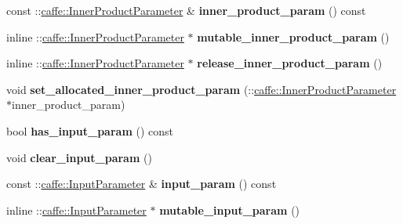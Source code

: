 \begin{DoxyCompactItemize}
\mbox{\label{classcaffe_1_1_layer_parameter_a1a350b27429e55733e114633ef5742a2}} 
const \+::\mbox{\hyperlink{classcaffe_1_1_inner_product_parameter}{caffe\+::\+Inner\+Product\+Parameter}} \& {\bfseries inner\+\_\+product\+\_\+param} () const
\item 
\mbox{\label{classcaffe_1_1_layer_parameter_a5242d3692dfb961f06d31edbbf6ab4df}} 
inline \+::\mbox{\hyperlink{classcaffe_1_1_inner_product_parameter}{caffe\+::\+Inner\+Product\+Parameter}} $\ast$ {\bfseries mutable\+\_\+inner\+\_\+product\+\_\+param} ()
\item 
\mbox{\label{classcaffe_1_1_layer_parameter_ae41ef48a356d6184a923774ea9990933}} 
inline \+::\mbox{\hyperlink{classcaffe_1_1_inner_product_parameter}{caffe\+::\+Inner\+Product\+Parameter}} $\ast$ {\bfseries release\+\_\+inner\+\_\+product\+\_\+param} ()
\item 
\mbox{\label{classcaffe_1_1_layer_parameter_a8054c3deaca85b1a269be1e074df4918}} 
void {\bfseries set\+\_\+allocated\+\_\+inner\+\_\+product\+\_\+param} (\+::\mbox{\hyperlink{classcaffe_1_1_inner_product_parameter}{caffe\+::\+Inner\+Product\+Parameter}} $\ast$inner\+\_\+product\+\_\+param)
\item 
\mbox{\label{classcaffe_1_1_layer_parameter_a3e9d7f5654f6e45a4c6228b922d06f8c}} 
bool {\bfseries has\+\_\+input\+\_\+param} () const
\item 
\mbox{\label{classcaffe_1_1_layer_parameter_a5341b8c329110e43302ca591e80c1a37}} 
void {\bfseries clear\+\_\+input\+\_\+param} ()
\item 
\mbox{\label{classcaffe_1_1_layer_parameter_abb668e78e66a444103898310abd930c4}} 
const \+::\mbox{\hyperlink{classcaffe_1_1_input_parameter}{caffe\+::\+Input\+Parameter}} \& {\bfseries input\+\_\+param} () const
\item 
\mbox{\label{classcaffe_1_1_layer_parameter_afab50c03343c258b5087acd860bf34e3}} 
inline \+::\mbox{\hyperlink{classcaffe_1_1_input_parameter}{caffe\+::\+Input\+Parameter}} $\ast$ {\bfseries mutable\+\_\+input\+\_\+param} ()

\end{DoxyCompactItemize}
